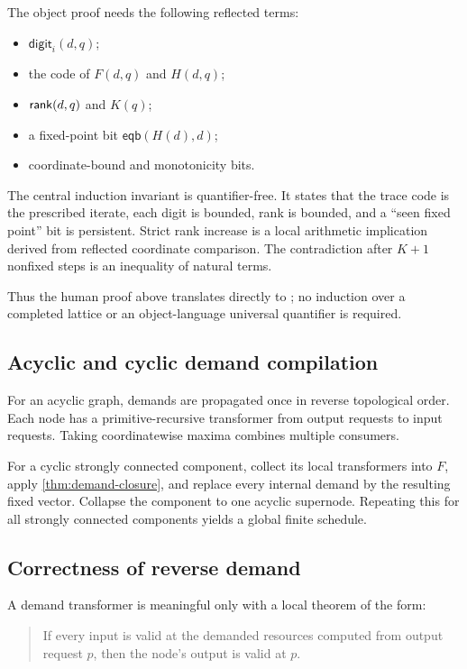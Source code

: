 The object proof needs the following reflected terms:

\begin{itemize}
\item \(\mathsf{digit}_i(d,q)\);
\item the code of \(F(d,q)\) and \(H(d,q)\);
\item \(\mathsf{rank}(d,q)\) and \(K(q)\);
\item a fixed-point bit \(\mathsf{eqb}(H(d),d)\);
\item coordinate-bound and monotonicity bits.
\end{itemize}

The central induction invariant is quantifier-free.  It states that the trace code is the prescribed iterate, each digit is bounded, rank is bounded, and a ``seen fixed point'' bit is persistent.  Strict rank increase is a local arithmetic implication derived from reflected coordinate comparison.  The contradiction after \(K+1\) nonfixed steps is an inequality of natural terms.

Thus the human proof above translates directly to ; no induction over a completed lattice or an object-language universal quantifier is required.

\subsection{Acyclic and cyclic demand compilation}

For an acyclic graph, demands are propagated once in reverse topological order.  Each node has a primitive-recursive transformer from output requests to input requests.  Taking coordinatewise maxima combines multiple consumers.

For a cyclic strongly connected component, collect its local transformers into \(F\), apply \cref{thm:demand-closure}, and replace every internal demand by the resulting fixed vector.  Collapse the component to one acyclic supernode.  Repeating this for all strongly connected components yields a global finite schedule.

\subsection{Correctness of reverse demand}

A demand transformer is meaningful only with a local theorem of the form:
\begin{quote}
If every input is valid at the demanded resources computed from output request \(p\), then the node's output is valid at \(p\).
\end{quote}

